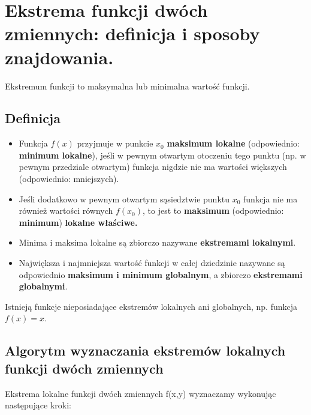 \section{Ekstrema funkcji dwóch zmiennych: definicja i sposoby znajdowania.}

Ekstremum funkcji to maksymalna lub minimalna wartość funkcji.

\subsection{Definicja}

\begin{itemize}[itemsep=0pt,partopsep=0pt, parsep=0pt]
    \item Funkcja $f(x)$ przyjmuje w punkcie $x_{0}$ \textbf{maksimum lokalne} (odpowiednio: \textbf{minimum lokalne}),
    jeśli w pewnym otwartym otoczeniu tego punktu (np. w pewnym przedziale otwartym)
    funkcja nigdzie nie ma wartości większych (odpowiednio: mniejszych).

    \item Jeśli dodatkowo w pewnym otwartym sąsiedztwie punktu $x_{0}$ funkcja nie ma również wartości równych $f(x_0)$,
    to jest to \textbf{maksimum} (odpowiednio: \textbf{minimum}) \textbf{lokalne właściwe.}

    \item Minima i maksima lokalne są zbiorczo nazywane \textbf{ekstremami lokalnymi}.

    \item Największa i najmniejsza wartość funkcji w całej dziedzinie nazywane są odpowiednio
    \textbf{maksimum i minimum globalnym}, a zbiorczo \textbf{ekstremami globalnymi}.
\end{itemize}

Istnieją funkcje nieposiadające ekstremów lokalnych ani globalnych, np. funkcja $f(x)=x$.

\subsection{Algorytm wyznaczania ekstremów lokalnych funkcji dwóch zmiennych}

Ekstrema lokalne funkcji dwóch zmiennych f(x,y) wyznaczamy wykonując następujące kroki:

